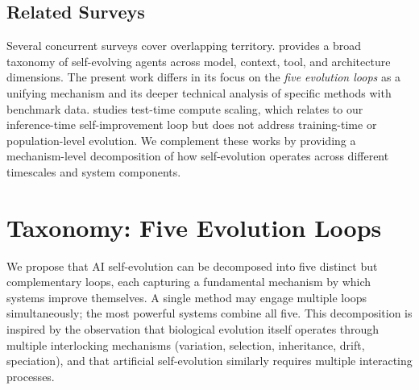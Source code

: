 \documentclass[11pt,a4paper]{article}
\begin{document}
\subsection{Related Surveys}

Several concurrent surveys cover overlapping territory. \citet{survey2024selfevolution} provides a broad taxonomy of self-evolving agents across model, context, tool, and architecture dimensions. The present work differs in its focus on the \emph{five evolution loops} as a unifying mechanism and its deeper technical analysis of specific methods with benchmark data. \citet{snell2024rise} studies test-time compute scaling, which relates to our inference-time self-improvement loop but does not address training-time or population-level evolution. We complement these works by providing a mechanism-level decomposition of how self-evolution operates across different timescales and system components.

\section{Taxonomy: Five Evolution Loops}
\label{sec:taxonomy}

We propose that AI self-evolution can be decomposed into five distinct but complementary loops, each capturing a fundamental mechanism by which systems improve themselves. A single method may engage multiple loops simultaneously; the most powerful systems combine all five. This decomposition is inspired by the observation that biological evolution itself operates through multiple interlocking mechanisms (variation, selection, inheritance, drift, speciation), and that artificial self-evolution similarly requires multiple interacting processes.
\end{document}
